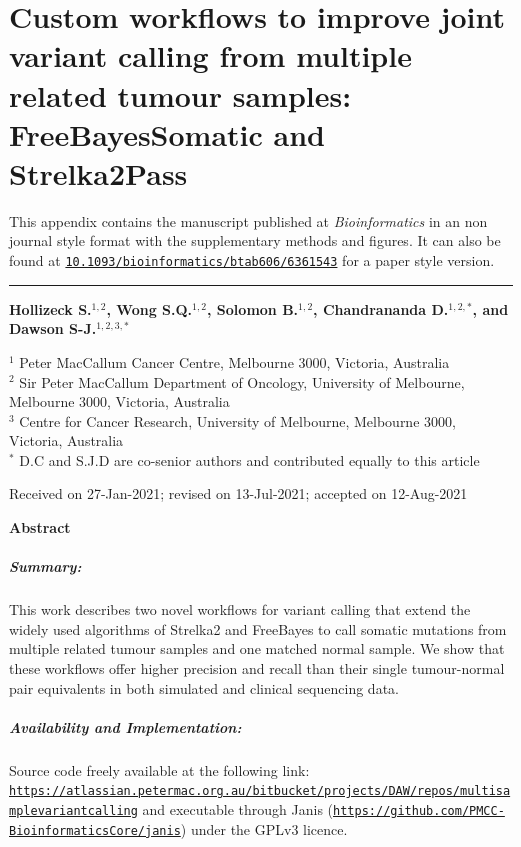 \chapter[Joint somatic variant calling - publication]{Custom workflows to improve joint variant calling from multiple related tumour samples: FreeBayesSomatic and Strelka2Pass}
\label{ch:appendixManuscript}

This appendix contains the manuscript published at \textit{Bioinformatics} in an non journal style format with the supplementary methods and figures. It can also be found at \href{https://doi.org/10.1093/bioinformatics/btab606/6361543}{\nolinkurl{10.1093/bioinformatics/btab606/6361543}} for a paper style version.
\vspace{1em}
\hrule
\vspace{2em}

{\Large \textbf{Hollizeck S.$^{1,2}$, Wong S.Q.$^{1,2}$, Solomon B.$^{1,2}$, Chandrananda D.$^{1,2,*}$, and Dawson S-J.$^{1,2,3,*}$}}

{
$^1$ Peter MacCallum Cancer Centre, Melbourne 3000, Victoria, Australia\\
$^2$ Sir Peter MacCallum Department of Oncology, University of Melbourne, Melbourne 3000, Victoria, Australia\\
$^3$ Centre for Cancer Research, University of Melbourne, Melbourne 3000, Victoria, Australia\\
\vspace{0.5em}
$^*$ D.C and S.J.D are co-senior authors and contributed equally to this article
}

{\small
Received on 27-Jan-2021; revised on 13-Jul-2021; accepted on 12-Aug-2021
}

{\Large \textbf{Abstract}}
\vspace{-2em}
\paragraph*{\textbf{Summary:}} This work describes two novel workflows for variant calling that extend the widely used algorithms of Strelka2 and FreeBayes to call somatic mutations from multiple related tumour samples and one matched normal sample. We show that these workflows offer higher precision and recall than their single tumour-normal pair equivalents in both simulated and clinical sequencing data.
\vspace{-2em}
\paragraph*{\textbf{Availability and Implementation:}} Source code freely available at the following link:
\href{https://atlassian.petermac.org.au/bitbucket/projects/DAW/repos/multisamplevariantcalling}{\nolinkurl{https://atlassian.petermac.org.au/bitbucket/projects/DAW/repos/multisamplevariantcalling}}
and executable through Janis (\href{https://github.com/PMCC-BioinformaticsCore/janis}{\nolinkurl{https://github.com/PMCC-BioinformaticsCore/janis}}) under the GPLv3 licence.
\vspace{-2em}
